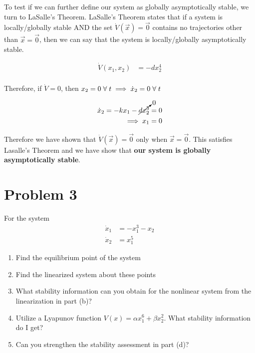 \documentclass{article}
\begin{document}
  To test if we can further define our system as globally asymptotically stable,
  we turn to LaSalle's Theorem. LaSalle's Theorem states that if a system is
  locally/globally stable AND the set $\dot{V}(\vec{x})=\vec{0}$ contains no
  trajectories other than $\vec{x}=\vec{0}$, then we can say that the system is
  locally/globally asymptotically stable.

  \begin{align*}
    \dot{V}(x_1,x_2) &= -dx_2^4 \\
  \end{align*}

  Therefore, if $\dot{V}=0$, then $x_2=0 \hspace{1mm} \forall \hspace{1mm} t
  \implies \dot{x}_2=0 \hspace{1mm} \forall \hspace{1mm} t$

  \begin{align*}
    \dot{x}_2 = -kx_1 - \cancelto{0}{dx_2^3} = 0 \\
    \implies x_1 = 0
  \end{align*}

  Therefore we have shown that $\dot{V}(\vec{x})=\vec{0}$ only when
  $\vec{x}=\vec{0}$. This satisfies Lasalle's Theorem and we have show that
  \textbf{our system is globally asymptotically stable}.

  \newpage

  \section{Problem 3}

  For the system
  \begin{align*}
    \dot{x}_1 &= -x_1^3 - x_2 \\
    \dot{x}_2 &= x_1^5
  \end{align*}
  \begin{enumerate}[label=(\alph*)]
    \item Find the equilibrium point of the system
    \item Find the linearized system about these points
    \item What stability information can you obtain for the nonlinear system
      from the linearization in part (b)?
    \item Utilize a Lyapunov function $V(x) = \alpha x_1^6 + \beta x_2^2$. What
        stability information do I get?
    \item Can you strengthen the stability assessment in part (d)?
  \end{enumerate} 
\end{document}
